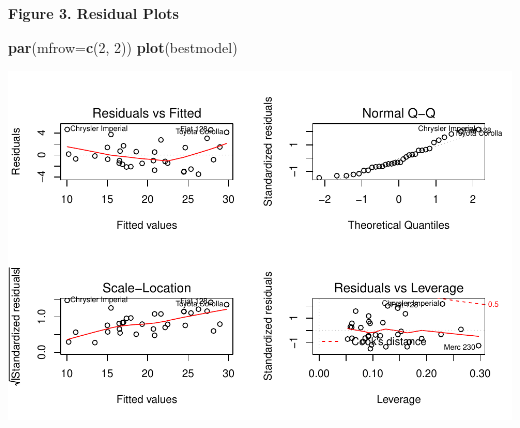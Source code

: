 \documentclass[]{article}
\newenvironment{Shaded}{\begin{snugshade}}{\end{snugshade}}
\newcommand{\KeywordTok}[1]{\textcolor[rgb]{0.13,0.29,0.53}{\textbf{{#1}}}}
\newcommand{\DataTypeTok}[1]{\textcolor[rgb]{0.13,0.29,0.53}{{#1}}}
\newcommand{\DecValTok}[1]{\textcolor[rgb]{0.00,0.00,0.81}{{#1}}}
\newcommand{\NormalTok}[1]{{#1}}
\begin{document}
\textbf{Figure 3. Residual Plots}

\begin{Shaded}
\begin{Highlighting}[]
\KeywordTok{par}\NormalTok{(}\DataTypeTok{mfrow=}\KeywordTok{c}\NormalTok{(}\DecValTok{2}\NormalTok{, }\DecValTok{2}\NormalTok{))}
\KeywordTok{plot}\NormalTok{(bestmodel)}
\end{Highlighting}
\end{Shaded}

\includegraphics{./Regression_Models_-_Course_Project_files/figure-latex/unnamed-chunk-8.pdf}
\end{document}
